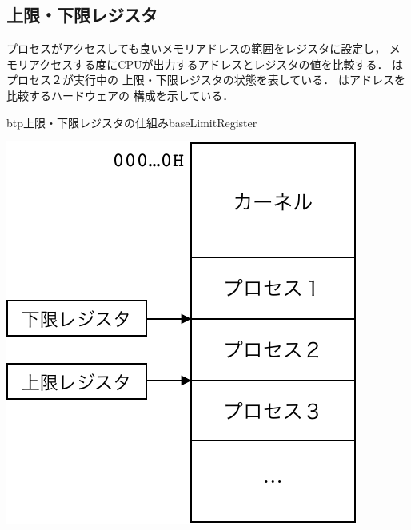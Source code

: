 \subsection{上限・下限レジスタ}
プロセスがアクセスしても良いメモリアドレスの範囲をレジスタに設定し，
メモリアクセスする度にCPUが出力するアドレスとレジスタの値を比較する．
はプロセス２が実行中の
上限・下限レジスタの状態を表している．
はアドレスを比較するハードウェアの
構成を示している．

\begin{myfig}{btp}{上限・下限レジスタの仕組み}{baseLimitRegister}
  \begin{minipage}{0.49\columnwidth}
    \begin{center}
      \includegraphics[scale=0.66]{Fig/baseLimitAddrSpace-crop.pdf}
      \label{fig:baseLimitAddrSpace}
    \end{center}
  \end{minipage}
  \begin{minipage}{0.49\columnwidth}
    \begin{center}

\end{center}
\end{minipage}
\end{myfig}
